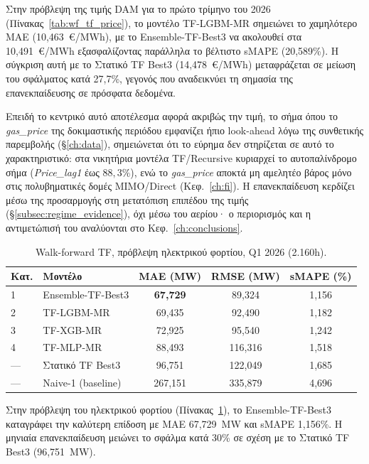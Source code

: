 Στην πρόβλεψη της τιμής DAM για το πρώτο τρίμηνο του 2026 (Πίνακας~\ref{tab:wf_tf_price}), το μοντέλο TF-LGBM-MR σημειώνει το χαμηλότερο MAE (10,463~€/MWh), με το Ensemble-TF-Best3 να ακολουθεί στα 10,491~€/MWh εξασφαλίζοντας παράλληλα το βέλτιστο sMAPE (20,589\%). Η σύγκριση αυτή με το Στατικό TF Best3 (14,478~€/MWh) μεταφράζεται σε μείωση του σφάλματος κατά 27,7\%, γεγονός που αναδεικνύει τη σημασία της επανεκπαίδευσης σε πρόσφατα δεδομένα.

Επειδή το κεντρικό αυτό αποτέλεσμα αφορά ακριβώς την τιμή, το σήμα όπου το \textit{gas\_price} της δοκιμαστικής περιόδου εμφανίζει ήπιο look-ahead λόγω της συνθετικής παρεμβολής (§\ref{ch:data}), σημειώνεται ότι το εύρημα δεν στηρίζεται σε αυτό το χαρακτηριστικό: στα νικητήρια μοντέλα TF/Recursive κυριαρχεί το αυτοπαλίνδρομο σήμα (\textit{Price\_lag1} έως $88{,}3\%$), ενώ το \textit{gas\_price} αποκτά μη αμελητέο βάρος μόνο στις πολυβηματικές δομές MIMO/Direct (Κεφ.~\ref{ch:fi}). Η επανεκπαίδευση κερδίζει μέσω της προσαρμογής στη μετατόπιση επιπέδου της τιμής (§\ref{subsec:regime_evidence}), όχι μέσω του αερίου· ο περιορισμός και η αντιμετώπισή του αναλύονται στο Κεφ.~\ref{ch:conclusions}.

\begin{table}[H]
  \centering
  \caption{Walk-forward TF, πρόβλεψη ηλεκτρικού φορτίου, Q1 2026 (2.160h).}
  \label{tab:wf_tf_load}
  \begin{tabular}{llccc}
    \toprule
    \textbf{Κατ.} & \textbf{Μοντέλο} & \textbf{MAE (MW)} & \textbf{RMSE (MW)} & \textbf{sMAPE (\%)} \\
    \midrule
    1   & Ensemble-TF-Best3  & \textbf{67,729} & 89,324  & 1,156 \\
    2   & TF-LGBM-MR         & 69,435          & 92,490  & 1,182 \\
    3   & TF-XGB-MR          & 72,925          & 95,540  & 1,242 \\
    4   & TF-MLP-MR          & 88,493          & 116,316 & 1,518 \\
    \midrule
    --- & Στατικό TF Best3   & 96,751          & 122,049 & 1,685 \\
    --- & Naive-1 (baseline) & 267,151         & 335,879 & 4,696 \\
    \bottomrule
  \end{tabular}
\end{table}

Στην πρόβλεψη του ηλεκτρικού φορτίου (Πίνακας~\ref{tab:wf_tf_load}), το Ensemble-TF-Best3 καταγράφει την καλύτερη επίδοση με MAE 67,729~MW και sMAPE 1,156\%. Η μηνιαία επανεκπαίδευση μειώνει το σφάλμα κατά 30\% σε σχέση με το Στατικό TF Best3 (96,751~MW).

